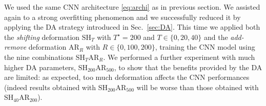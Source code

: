 %


%
%


We used the same CNN architecture \eqref{eq:archi} as in previous section. We assisted again to a strong overfitting phenomenon and we successfully reduced it by applying the DA strategy introduced in Sec.~\ref{sec:DA}. This time we applied both the \emph{shifting} deformation $\mathrm{SH}_T$ with $T^\star = 200$ and $T\in\{0,20,40\}$ and the \emph{add-remove} deformation $\mathrm{AR}_R$ with $R\in \{0,100,200\}$, training the CNN model using the nine combinations $\mathrm{SH}_T\mathrm{AR}_R$. We performed a further experiment with much higher DA parameters, \ie $\mathrm{SH}_{200}\mathrm{AR}_{500}$, to show that the benefits provided by the DA are limited: as expected, too much deformation affects the CNN performances (indeed results obtained with $\mathrm{SH}_{200}\mathrm{AR}_{500}$ will be worse than those obtained with \eg $\mathrm{SH}_{40}\mathrm{AR}_{200}$).\\





